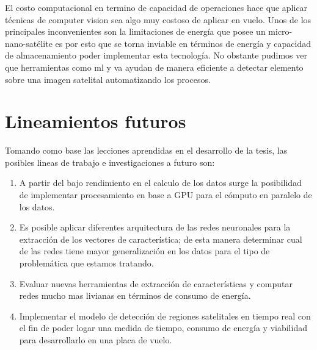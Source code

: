 El costo computacional en termino de capacidad de operaciones hace que aplicar técnicas de computer vision sea algo muy costoso de aplicar en vuelo. Unos de los principales inconvenientes son la limitaciones de energía que posee un micro-nano-satélite es por esto que se torna inviable en términos de energía y capacidad de almacenamiento poder implementar esta tecnología. No obstante pudimos ver que herramientas como \ac{ml} y \ac{va} ayudan de manera eficiente a detectar elemento sobre una imagen satelital automatizando los procesos.


\section{Lineamientos futuros}\label{linasfuturas}
Tomando como base las lecciones aprendidas en el desarrollo de la tesis, las posibles lineas de trabajo e investigaciones a futuro son:
\begin{enumerate}
 \item A partir del bajo rendimiento en el calculo de los datos surge la posibilidad de implementar procesamiento en base a GPU para el cómputo en paralelo de los datos.
 \item Es posible aplicar diferentes arquitectura de las redes neuronales para la extracción de los vectores de característica; de esta manera determinar cual de las redes tiene mayor generalización en los datos para el tipo de problemática que estamos tratando.
 \item Evaluar nuevas herramientas de extracción de características y computar redes mucho mas livianas en términos de consumo de energía.
\item Implementar el modelo de detección de regiones satelitales en tiempo real con el fin de poder logar una medida de tiempo, consumo de energía y viabilidad para desarrollarlo en una placa de vuelo. 
\end{enumerate}
